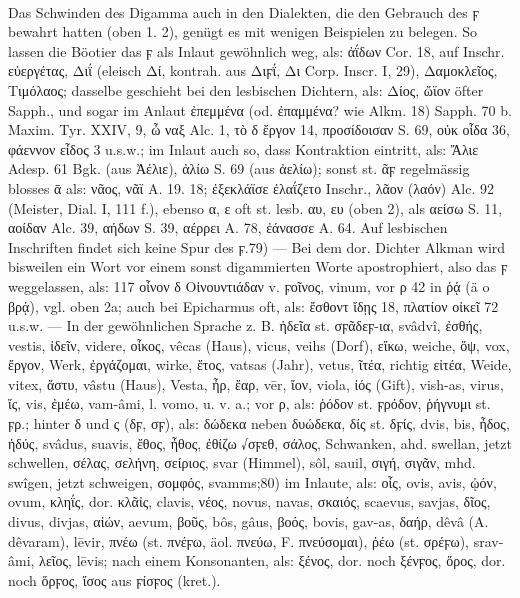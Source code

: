 \paragraph{} Das Schwinden des Digamma auch in den Dialekten, die den Gebrauch
des ϝ bewahrt hatten (oben 1. 2), genügt es mit wenigen Beispielen zu belegen.
So lassen die Böotier das ϝ als Inlaut gewöhnlich weg, als: ἀΐδων Cor. 18, auf
Inschr. εὐεργέτας, Διΐ (eleisch Δί, kontrah. aus Διϝΐ, Δι Corp. Inscr. I, 29),
Δαμοκλεῖος, Τιμόλαος; dasselbe geschieht bei den lesbischen Dichtern, als: Δίος,
ὤϊον öfter Sapph., und sogar im Anlaut ἐπεμμένα (od. ἐπαμμένα? wie Alkm. 18)
Sapph. 70 b. Maxim. Tyr. XXIV, 9, ὦ ναξ Alc. 1, τὸ δ ἔργον 14, προσίδοισαν S.
69, οὐκ οἶδα 36, φάεννον εἶδος 3 u.s.w.; im Inlaut auch so, dass Kontraktion
eintritt, als: Ἄλιε Adesp. 61 Bgk. (aus Ἀέλιε), ἀλίω S. 69 (aus ἀελίω); sonst
st. ᾶϝ regelmässig blosses ᾱ als: νᾶος, νᾶϊ A. 19. 18; ἐξεκλάϊσε ἐλαΐζετο
Inschr., λᾶον (λαόν) Alc. 92 (Meister, Dial. I, 111 f.), ebenso α, ε oft st.
lesb. αυ, ευ (oben 2), als αείσω S. 11, αοίδαν Alc. 39, αήδων S. 39, αέρρει A.
78, ἐάνασσε A. 64. Auf lesbischen Inschriften findet sich keine Spur des ϝ.79) —
Bei dem dor. Dichter Alkman wird bisweilen ein Wort vor einem sonst digammierten
Worte apostrophiert, also das ϝ weggelassen, als: 117 οἶνον δ Οἰνουντιάδαν v.
ϝοῖνος, vinum, vor ρ 42 in ῥᾴ (ä o  βρᾴ), vgl. oben 2a; auch bei Epicharmus
oft, als: ἔσθοντ ἴδῃς 18, πλατίον οἰκεῖ 72 u.s.w. — In der gewöhnlichen
Sprache z. B. ἡδεῖα st. σϝᾶδεϝ-ια,  svâdvî, ἐσθής, vestis, ἰδεῖν, videre,
οἶκος,  vêcas (Haus),  vicus,  veihs (Dorf), εἴκω, weiche, ὄψ,
vox, ἔργον, Werk, ἐργάζομαι, wirke, ἔτος,  vatsas (Jahr),  vetus, ῖτέα,
richtig εἰτέα, Weide,  vitex, ἄστυ,  vâstu (Haus),  Vesta, ἦρ, ἔαρ, vēr,
ἴον, viola, ἰός (Gift),  vish-as,  virus, ἴς, vis, ἐμέω,  vam-âmi, l.
vomo, u. v. a.; vor ρ, als: ῥόδον st. ϝρόδον, ῥήγνυμι st. ϝρ.; hinter δ und ς
(δϝ, σϝ), als: δώδεκα neben δυώδεκα, δίς st. δϝίς,  dvis,  bis, ἦδος, ἡδύς,
 svâdus,  suavis, ἔθος, ἦθος, ἐθίζω √σϝεθ, σάλος, Schwanken, ahd.
swellan, jetzt schwellen, σέλας, σελήνη, σείριος,  svar (Himmel),  sôl,
 sauil, σιγή, σιγᾶν, mhd. swîgen, jetzt schweigen, σομφός,  svamms;80)
im Inlaute, als: οἶς, ovis,  avis, ᾠόν, ovum, κληΐς, dor. κλᾶἰς, clavis,
νέος, novus,  navas, σκαιός, scaevus,  savjas, δῖος, divus,  divjas,
αἰών, aevum, βοῦς,  bôs,  gâus, βοός, bovis,  gav-as, δαήρ,  dêvâ (A.
dêvaram),  lēvir, πνέω (st. πνέϝω, äol. πνεύω, F. πνεύσομαι), ῥέω (st. σρέϝω),
 srav-âmi, λεῖος, lēvis; nach einem Konsonanten, als: ξένος, dor. noch
ξένϝος, ὅρος, dor. noch ὅρϝος, ἴσος aus ϝίσϝος (kret.).

